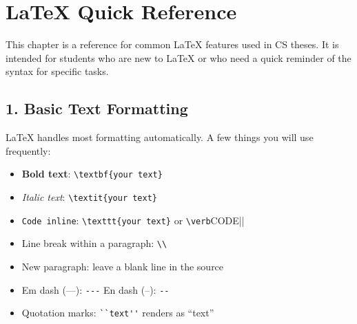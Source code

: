 %
%
%     

\chapter*{LaTeX Quick Reference}

\noindent
This chapter is a reference for common LaTeX features used in
CS theses. It is intended for students who are new to LaTeX or
who need a quick reminder of the syntax for specific tasks.

\section*{1. Basic Text Formatting}

\noindent
LaTeX handles most formatting automatically. A few things you
will use frequently:

\begin{itemize}
    \item \textbf{Bold text}: \verb|\textbf{your text}|
    \item \textit{Italic text}: \verb|\textit{your text}|
    \item \texttt{Code inline}: \verb|\texttt{your text}| or \verb|\verb|CODE||
    \item Line break within a paragraph: \verb|\\|
    \item New paragraph: leave a blank line in the source
    \item Em dash (—): \verb|---| \quad En dash (–): \verb|--|
    \item Quotation marks: \verb|``text''| renders as ``text''
\end{itemize}


